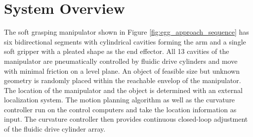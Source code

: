 \section{System Overview}
The soft grasping manipulator shown in Figure \ref{fig:egg_approach_sequence} has six bidirectional segments with cylindrical cavities forming the arm and a single soft gripper with a pleated shape as the end effector. 
All 13 cavities of the manipulator are pneumatically controlled by fluidic drive cylinders \cite{marchese2014design} and move with minimal friction on a level plane.
An object of feasible size but unknown geometry is randomly placed within the reachable envelop of the manipulator.  
The location of the manipulator and the object is determined with an external localization system. 
The motion planning algorithm as well as the curvature controller run on the control computers and take the location information as input.
The curvature controller then provides continuous closed-loop adjustment of the fluidic drive cylinder array.



